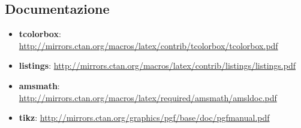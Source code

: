 \documentclass{csnotes}
\begin{document}
\subsection{Documentazione}

\begin{itemize}
    \item \textbf{tcolorbox}: \url{http://mirrors.ctan.org/macros/latex/contrib/tcolorbox/tcolorbox.pdf}
    \item \textbf{listings}: \url{http://mirrors.ctan.org/macros/latex/contrib/listings/listings.pdf}
    \item \textbf{amsmath}: \url{http://mirrors.ctan.org/macros/latex/required/amsmath/amsldoc.pdf}
    \item \textbf{tikz}: \url{http://mirrors.ctan.org/graphics/pgf/base/doc/pgfmanual.pdf}
\end{itemize}

\makebackcover{}

\end{document}
